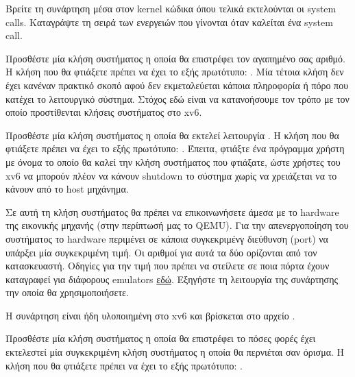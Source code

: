 \documentclass[18pt]{extarticle}
\begin{document}
\begin{question}
    Βρείτε τη συνάρτηση μέσα στον kernel κώδικα όπου τελικά εκτελούνται οι system calls.
    Καταγράψτε τη σειρά των ενεργειών που γίνονται όταν καλείται ένα system call.
\end{question}

\begin{question}
    Προσθέστε μία κλήση συστήματος η οποία θα επιστρέφει τον αγαπημένο σας αριθμό.
    Η κλήση που θα φτιάξετε πρέπει να έχει το εξής πρωτότυπο: .
    Μία τέτοια κλήση δεν έχει κανέναν πρακτικό σκοπό αφού δεν εκμεταλεύεται κάποια πληροφορία ή 
    πόρο που κατέχει το λειτουργικό σύστημα. Στόχος εδώ είναι να κατανοήσουμε τον τρόπο με τον οποίο
    προστίθενται κλήσεις συστήματος στο xv6.
\end{question}

\begin{question}
    Προσθέστε μία κλήση συστήματος η οποία θα εκτελεί λειτουργία . 
    Η κλήση που θα φτιάξετε πρέπει να έχει το εξής πρωτότυπο: .
    Έπειτα, φτιάξτε ένα πρόγραμμα χρήστη με όνομα  το οποίο θα καλεί την κλήση συστήματος που φτιάξατε, ώστε 
    χρήστες του xv6 να μπορούν πλέον να κάνουν shutdown το σύστημα χωρίς να χρειάζεται να το κάνουν από το host μηχάνημα.

    Σε αυτή τη κλήση συστήματος θα πρέπει να επικοινωνήσετε άμεσα με το hardware της εικονικής μηχανής (στην περίπτωσή μας το QEMU).
    Για την απενεργοποίηση του συστήματος το hardware περιμένει σε κάποια συγκεκριμένγ διεύθυνση (port) να υπάρξει μία συγκεκριμένη 
    τιμή. Οι αριθμοί για αυτά τα δύο ορίζονται από τον κατασκευαστή.
    Οδηγίες για την τιμή που πρέπει να στείλετε σε ποια πόρτα έχουν καταγραφεί για διάφορους emulators \href{https://wiki.osdev.org/Shutdown}{εδώ}.
    Εξηγήστε τη λειτουργία της συνάρτησης  την οποία θα χρησιμοποιήσετε.

    \begin{info}[Σημείωση:]
        Η συνάρτηση  είναι ήδη υλοποιημένη στο xv6 και βρίσκεται στο αρχείο .
    \end{info}
\end{question}

\begin{question}
    Προσθέστε μία κλήση συστήματος η οποία θα επιστρέφει το πόσες φορές έχει εκτελεστεί μία 
    συγκεκριμένη κλήση συστήματος η οποία θα περνιέται σαν όρισμα.
    Η κλήση που θα φτιάξετε πρέπει να έχει το εξής πρωτότυπο: .
\end{question}
\end{document}
